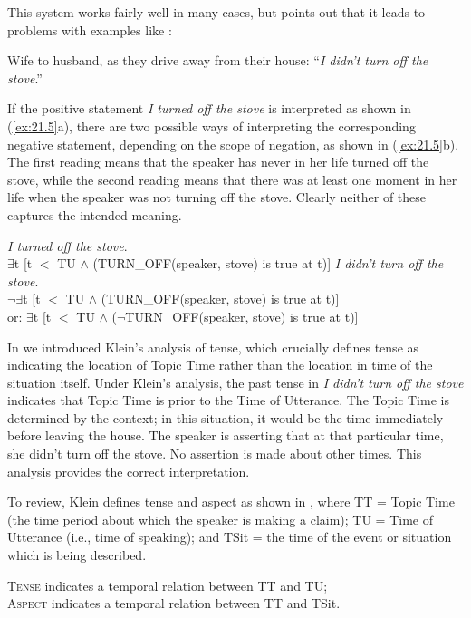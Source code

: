 This system works fairly well in many cases, but \citet{Partee1973} points out that it leads to problems with examples like :


\ea \label{ex:21.4}
Wife to husband, as they drive away from their house: “\textit{I didn’t turn off the stove}.”
\z


If the positive statement \textit{I turned off the stove} is interpreted as shown in (\ref{ex:21.5}a), there are two possible ways of interpreting the corresponding negative statement, depending on the scope of negation, as shown in (\ref{ex:21.5}b). The first reading means that the speaker has never in her life turned off the stove, while the second reading means that there was at least one moment in her life when the speaker was not turning off the stove. Clearly neither of these captures the intended meaning.


\ea \label{ex:21.5}
\ea   \textit{I turned off the stove}. \\ 
${\exists}$t [t {$<$} TU $\wedge$ (TURN\_OFF(speaker, stove) is true at t)]
\ex   \textit{I didn’t turn off the stove}. \\
$¬{\exists}$t [t {$<$} TU $\wedge$ (TURN\_OFF(speaker, stove) is true at t)]\\
  or:  ${\exists}$t [t {$<$} TU $\wedge$ ($¬$TURN\_OFF(speaker, stove) is true at t)]
\z \z

In  we introduced Klein’s analysis of tense, which crucially defines tense as indicating the location of Topic Time rather than the location in time of the situation itself. Under Klein’s analysis, the past tense in  \textit{I didn’t turn off the stove} indicates that Topic Time is prior to the Time of Utterance. The Topic Time is determined by the context; in this situation, it would be the time immediately before leaving the house. The speaker is asserting that at that particular time, she didn’t turn off the stove. No assertion is made about other times. This analysis provides the correct interpretation.


To review, Klein defines tense and aspect as shown in , where TT = Topic Time (the time period about which the speaker is making a claim); TU = Time of Utterance (i.e., time of speaking); and TSit = the time of the event or situation which is being described.


\ea \label{ex:21.6}
\ea  \textsc{Tense} indicates a temporal relation between TT and TU;\\
\ex \textsc{Aspect} indicates a temporal relation between TT and TSit.
                       \z
\z


